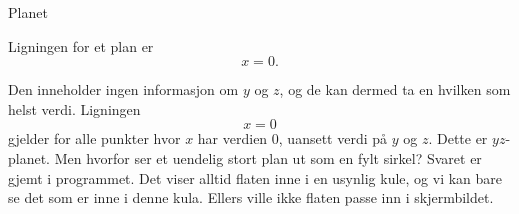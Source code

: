 \documentclass[no]{./../../common/SurferDesc}%
\begin{document}
\footnotesize
%

\begin{surferPage}
  \begin{surferTitle}Planet\end{surferTitle}
  
   \begin{surferText}
Ligningen for et plan er \[x=0.\]

Den inneholder ingen informasjon om $y$ og $z$, og de kan dermed ta en hvilken som helst verdi. Ligningen \[x=0\] gjelder
 for alle punkter hvor $x$ har verdien $0$, uansett verdi på $y$ og $z$. Dette er $yz$-planet.
\newline \newline
Men hvorfor ser et uendelig stort plan ut som en fylt sirkel? Svaret er gjemt i programmet. Det viser 
alltid flaten inne i en usynlig kule, og vi kan bare se det som er inne i denne kula. Ellers 
ville ikke flaten passe inn i skjermbildet. 
     \end{surferText}
\end{surferPage}

\end{document}
